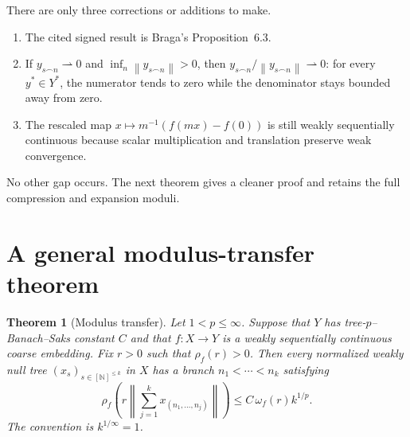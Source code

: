 \documentclass[11pt]{amsart}
\newtheorem{theorem}{Theorem}[section]
\theoremstyle{definition}
\theoremstyle{remark}
\newcommand{\N}{\mathbb N}
\newcommand{\norm}[1]{\left\lVert #1\right\rVert}
\begin{document}
There are only three corrections or additions to make.
\begin{enumerate}[label=\textup{(\arabic*)}]
 \item The cited signed result is Braga's Proposition~6.3.
 \item If $y_{s\frown n}\rightharpoonup0$ and $\inf_n\norm{y_{s\frown n}}>0$, then $y_{s\frown n}/\norm{y_{s\frown n}}\rightharpoonup0$: for every $y^*\in Y^*$, the numerator tends to zero while the denominator stays bounded away from zero.
 \item The rescaled map $x\mapsto m^{-1}(f(mx)-f(0))$ is still weakly sequentially continuous because scalar multiplication and translation preserve weak convergence.
\end{enumerate}
No other gap occurs.  The next theorem gives a cleaner proof and retains the full compression and expansion moduli.

\section{A general modulus-transfer theorem}

\begin{theorem}[Modulus transfer]\label{thm:modulus-transfer}
Let $1<p\le\infty$.  Suppose that $Y$ has tree-$p$--Banach--Saks constant $C$ and that $f:X\to Y$ is a weakly sequentially continuous coarse embedding.  Fix $r>0$ such that $\rho_f(r)>0$.  Then every normalized weakly null tree $(x_s)_{s\in[\N]^{\le k}}$ in $X$ has a branch $n_1<\cdots<n_k$ satisfying
\begin{equation}\label{eq:master-transfer}
 \rho_f\!\left(
  r\norm{\sum_{j=1}^k x_{(n_1,\ldots,n_j)}}
 \right)
 \le C\,\omega_f(r)k^{1/p}.
\end{equation}
The convention is $k^{1/\infty}=1$.
\end{theorem}
\end{document}
